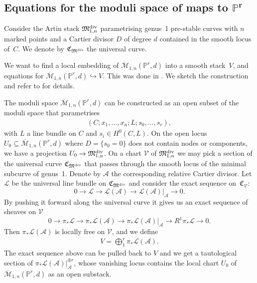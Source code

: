 \documentclass[pdftex]{sigma}
\numberwithin{equation}{section}
\newcommand{\MM}[4]{\overline{\mathcal M}_{#1,#2}(#3,#4)}
\begin{document}
\subsection[Equations for the moduli space of maps to $\mathbb P^r$]{Equations for the moduli space of maps to $\boldsymbol{\mathbb P^r}$} \label{eq from twist}

 \begin{notation} Consider the Artin stack $\mathfrak{M}^{\rm div}_{1,n}$ parametrising genus~1 pre-stable curves with $n$ marked points and a Cartier divisor $D$ of degree $d$ contained in the smooth locus of~$C$. We denote by $\mathfrak{C}_{\mathfrak{M}^{\rm div}}$ the universal curve.
 \end{notation}

We want to find a local embedding of $\MM{1}{n}{\mathbb P^r}{d}$ into a smooth stack~$V$, and equations for $\MM{1}{n}{\mathbb P^r}{d}\hookrightarrow V$. This was done in \cite{CF-K,HL}. We sketch the construction and refer to \cite{HL} for details.

The moduli space $\MM{1}{n}{\mathbb P^r}{d}$ can be constructed as an open subset of the moduli space that parametrises \begin{gather*}(C;x_1,\ldots,x_n;L;s_0,\ldots,s_r),\end{gather*} with $L$ a line bundle on $C$ and $s_i\in H^0(C,L)$. On the open locus $U_0\subseteq \MM{1}{n}{\mathbb P^r}{d}$ where $D=\{s_0=0\}$ does not contain nodes or components, we have a projection
$U_0\to\mathfrak{M}^{\rm div}_{1,n}$. On a chart $\mathcal V$ of $\mathfrak{M}^{\rm div}_{1,n}$ we may pick a section of the universal curve $\mathfrak C_{\mathfrak{M}^{\rm div}}$ that passes through the smooth locus of the minimal subcurve of genus~1. Denote by $\mathcal A$ the corresponding relative Cartier divisor. Let $\mathcal L$ be the universal line bundle on $\mathfrak{C}_{\mathfrak{M}^{\rm div}}$ and consider the exact sequence on~$\mathfrak{C}_{\mathcal V}$:
\[
 0\to \mathcal L\to \mathcal L(\mathcal A)\to \mathcal L(\mathcal A)|_{\mathcal A}\to 0.
\]
By pushing it forward along the universal curve it gives us an exact sequence of sheaves on $\mathcal V$
\begin{equation*}%
 0\to \pi_*\mathcal L\to\pi_*\mathcal L(\mathcal A)\to \pi_*\mathcal L(\mathcal A)|_{\mathcal A}\to R^1\pi_*\mathcal L\to 0.
\end{equation*}
Then $\pi_*\mathcal L(\mathcal A)$ is locally free on $\mathcal V$, and we define \begin{gather*}V=\bigoplus _{1}^r\pi_*\mathcal L(\mathcal A).\end{gather*} The exact sequence above can be pulled back to $V$ and we get a tautological section of $\pi_*\mathcal L(\mathcal A)|_{\mathcal A}^{\oplus r}$, whose vanishing locus contains the local chart $U_0$ of $\MM{1}{n}{\mathbb P^r}{d}$ as an open substack.
\end{document}

